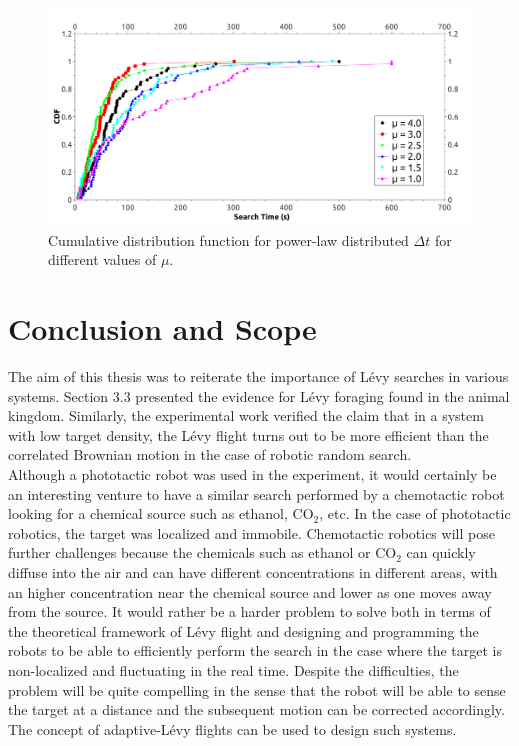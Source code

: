 \documentclass[12pt]{report}
\begin{document}
\begin{justify}
\begin{figure}[H]
\centering
\includegraphics[width = 14cm, keepaspectratio]{powerlawT_new1.pdf}
\caption{Cumulative distribution function for power-law distributed $\Delta t$ for different values of $\mu$.}
\label{fig:power}
\end{figure}




\chapter{Conclusion and Scope}
The aim of this thesis was to reiterate the importance of L\'evy searches in various systems. Section 3.3 presented the evidence for L\'evy foraging found in the animal kingdom. Similarly, the experimental work verified the claim that in a system with low target density, the L\'evy flight turns out to be more efficient than the correlated Brownian motion in the case of robotic random search.\\

Although a phototactic robot was used in the experiment, it would certainly be an interesting venture to have a similar search performed by a chemotactic robot looking for a chemical source such as ethanol, CO$_2$, etc. In the case of phototactic robotics, the target was localized and immobile. Chemotactic robotics will pose further challenges because the chemicals such as ethanol or CO$_2$ can quickly diffuse into the air and can have different concentrations in different areas, with an higher concentration near the chemical source and lower as one moves away from the source. It would rather be a harder problem to solve both in terms of the theoretical framework of L\'evy flight and designing and programming the robots to be able to efficiently perform the search in the case where the target is non-localized and fluctuating in the real time. Despite the difficulties, the problem will be quite compelling in the sense that the robot will be able to sense the target at a distance and the subsequent motion can be corrected accordingly. The concept of adaptive-L\'evy flights \cite{adaptLevy} can be used to design such systems. \\


\end{justify}
\end{document}

